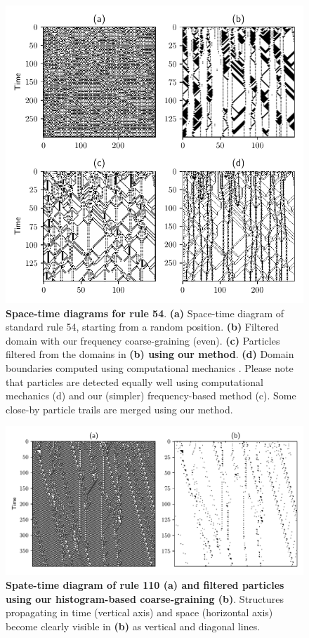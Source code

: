 \begin{figure}[th]
  \centering
  \includegraphics[width=\linewidth]{figures/rule54.pdf}
  \caption{\label{fig:rule54} \textbf{Space-time diagrams for rule 54}.
    \textbf{(a)} Space-time diagram of standard rule 54, starting from a random
    position. \textbf{(b)} Filtered domain with our frequency coarse-graining
    (even). \textbf{(c)} Particles filtered from the domains in \textbf{(b)
      using our method}. \textbf{(d)} Domain boundaries computed using
    computational mechanics \parencite{hansonComputationalMechanicsCellular1997}.
    Please note that particles are detected equally well using computational
    mechanics (d) and our (simpler) frequency-based method (c). Some close-by
    particle trails are merged using our method.}
\end{figure}

\begin{figure}[t]
  \centering
  \includegraphics[width=\linewidth]{figures/rule110.pdf}
  \caption{\label{fig:rule110} \textbf{Spate-time diagram of rule 110 (\textbf{a})
      and filtered particles using our histogram-based coarse-graining
      (\textbf{b})}. Structures propagating in time (vertical axis) and space
    (horizontal axis) become clearly visible in \textbf{(b)} as vertical and
    diagonal lines.
    }
\end{figure}

